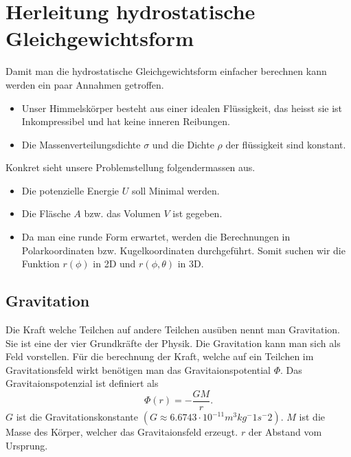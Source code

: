 %
%
%
%
\section{Herleitung hydrostatische Gleichgewichtsform
\label{planet:section:teil1}}
Damit man die hydrostatische Gleichgewichtsform einfacher berechnen kann werden ein paar Annahmen getroffen.
\begin{itemize}
	\item Unser Himmelskörper besteht aus einer idealen Flüssigkeit, das heisst sie ist Inkompressibel und hat keine inneren Reibungen.
	\item Die Massenverteilungsdichte \(\sigma\) und die Dichte \(\rho\) der flüssigkeit sind konstant.	
\end{itemize}

Konkret sieht unsere Problemstellung folgendermassen aus.
\begin{itemize}
	\item Die potenzielle Energie \(U\) soll Minimal werden.
	\item Die Fläsche \(A\) bzw. das Volumen \(V\) ist gegeben.
	\item Da man eine runde Form erwartet, werden die Berechnungen in Polarkoordinaten bzw. Kugelkoordinaten durchgeführt. Somit suchen wir die Funktion \(r(\phi)\) in 2D und \(r(\phi,\theta)\) in 3D.
\end{itemize}

\subsection{Gravitation}

Die Kraft welche Teilchen auf andere Teilchen ausüben nennt man Gravitation.
Sie ist eine der vier Grundkräfte der Physik.
Die Gravitation kann man sich als Feld vorstellen.
Für die berechnung der Kraft, welche auf ein Teilchen im Gravitationsfeld wirkt benötigen man das Gravitaionspotential \(\Phi\).
Das Gravitaionspotenzial ist definiert als
\begin{equation}
	\Phi(r) = -\frac{GM}{r}.
	\label{planet:equ:gravpot}
\end{equation}
\(G\) ist die Gravitationskonstante \((G \approx 6.6743 \cdot 10^{-11} m^3 kg^-1 s^-2)\).
\(M\) ist die Masse des Körper, welcher das Gravitaionsfeld erzeugt.
\(r\) der Abstand vom Ursprung.

